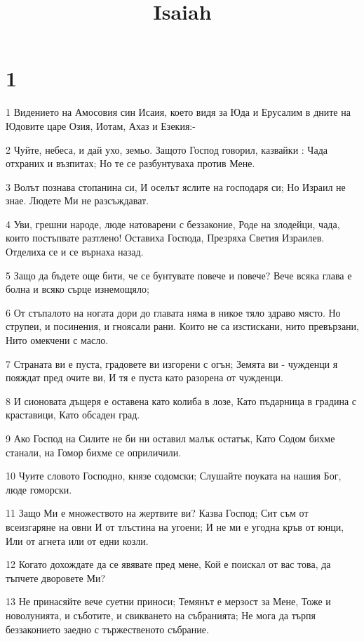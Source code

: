 

\title{Isaiah}


\chapter{1}

\par 1 Видението на Амосовия син Исаия, което видя за Юда и Ерусалим в дните на Юдовите царе Озия, Иотам, Ахаз и Езекия:-
\par 2 Чуйте, небеса, и дай ухо, земьо. Защото Господ говорил, казвайки : Чада отхраних и възпитах; Но те се разбунтуваха против Мене.
\par 3 Волът познава стопанина си, И оселът яслите на господаря си; Но Израил не знае. Людете Ми не разсъждават.
\par 4 Уви, грешни народе, люде натоварени с беззаконие, Роде на злодейци, чада, които постъпвате разтлено! Оставиха Господа, Презряха Светия Израилев. Отделиха се и се върнаха назад.
\par 5 Защо да бъдете още бити, че се бунтувате повече и повече? Вече всяка глава е болна и всяко сърце изнемощяло;
\par 6 От стъпалото на ногата дори до главата няма в никое тяло здраво място. Но струпеи, и посинения, и гноясали рани. Които не са изстискани, нито превързани, Нито омекчени с масло.
\par 7 Страната ви е пуста, градовете ви изгорени с огън; Земята ви - чужденци я пояждат пред очите ви, И тя е пуста като разорена от чужденци.
\par 8 И сионовата дъщеря е оставена като колиба в лозе, Като пъдарница в градина с краставици, Като обсаден град.
\par 9 Ако Господ на Силите не би ни оставил малък остатък, Като Содом бихме станали, на Гомор бихме се оприличили.
\par 10 Чуите словото Господно, князе содомски; Слушайте поуката на нашия Бог, люде гоморски.
\par 11 Защо Ми е множеството на жертвите ви? Казва Господ; Сит съм от всеизгаряне на овни И от тлъстина на угоени; И не ми е угодна кръв от юнци, Или от агнета или от едни козли.
\par 12 Когато дохождате да се явявате пред мене, Кой е поискал от вас това, да тъпчете дворовете Ми?
\par 13 Не принасяйте вече суетни приноси; Темянът е мерзост за Мене, Тоже и новолунията, и съботите, и свикването на събранията; Не мога да търпя беззаконието заедно с тържественото събрание.
